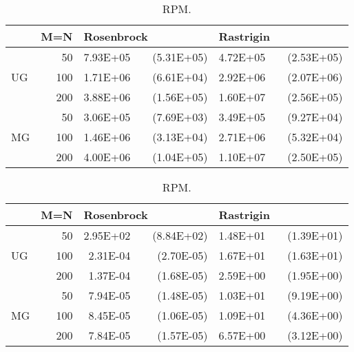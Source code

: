 \begin{table}[tbp]
\centering 
\caption{\aexpcontinuousnum RPM.}
\begin{tabular}{|lr|rr|rr|} \hline
\multicolumn{1}{|l|}{}&\multicolumn{1}{|c|}{M=N} & \multicolumn{2}{l|}{Rosenbrock} & \multicolumn{2}{l|}{Rastrigin} \\ \hline
\multicolumn{1}{|l|}{\multirow{3}{*}{UG}} & 50 & 7.93E+05 & ~~(5.31E+05) & 4.72E+05 & ~~(2.53E+05) \\ \cline{2-6}
\multicolumn{1}{|l|}{} & 100 & 1.71E+06 & ~~(6.61E+04) & 2.92E+06 & ~~(2.07E+06) \\ \cline{2-6}
\multicolumn{1}{|l|}{} & 200 & 3.88E+06 & ~~(1.56E+05) & 1.60E+07 & ~~(2.56E+05) \\ \hline
\multicolumn{1}{|l|}{\multirow{3}{*}{MG}} & 50 & 3.06E+05 & ~~(7.69E+03) & 3.49E+05 & ~~(9.27E+04) \\ \cline{2-6}
\multicolumn{1}{|l|}{} & 100 & 1.46E+06 & ~~(3.13E+04) & 2.71E+06 & ~~(5.32E+04) \\ \cline{2-6}
\multicolumn{1}{|l|}{} & 200 & 4.00E+06 & ~~(1.04E+05) & 1.10E+07 & ~~(2.50E+05) \\ \hline
\end{tabular}
\label{aexp-cont-eva-rpm}


\centering 
\caption{\aexpcontinuousval RPM.}
\begin{tabular}{|lr|rr|rr|} \hline
\multicolumn{1}{|l|}{}&\multicolumn{1}{|c|}{M=N} & \multicolumn{2}{l|}{Rosenbrock} & \multicolumn{2}{l|}{Rastrigin} \\ \hline
\multicolumn{1}{|l|}{\multirow{3}{*}{UG}} & 50 & 2.95E+02 & ~~(8.84E+02) & 1.48E+01 & ~~(1.39E+01) \\ \cline{2-6}
\multicolumn{1}{|l|}{} & 100 & 2.31E-04 & ~~(2.70E-05) & 1.67E+01 & ~~(1.63E+01) \\ \cline{2-6}
\multicolumn{1}{|l|}{} & 200 & 1.37E-04 & ~~(1.68E-05) & 2.59E+00 & ~~(1.95E+00) \\ \hline
\multicolumn{1}{|l|}{\multirow{3}{*}{MG}} & 50 & 7.94E-05 & ~~(1.48E-05) & 1.03E+01 & ~~(9.19E+00) \\ \cline{2-6}
\multicolumn{1}{|l|}{} & 100 & 8.45E-05 & ~~(1.06E-05) & 1.09E+01 & ~~(4.36E+00) \\ \cline{2-6}
\multicolumn{1}{|l|}{} & 200 & 7.84E-05 & ~~(1.57E-05) & 6.57E+00 & ~~(3.12E+00) \\ \hline
\end{tabular}
\label{aexp-cont-val-rpm}
\end{table} %


